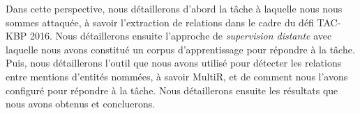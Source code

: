 \documentclass[PhD-Yoann-Dupont.tex]{subfiles}
\begin{document}
Dans cette perspective, nous détaillerons d'abord la tâche à laquelle nous nous sommes attaquée, à savoir l'extraction de relations dans le cadre du défi TAC-KBP 2016. Nous détaillerons ensuite l'approche de \emph{supervision distante} avec laquelle nous avons constitué un corpus d'apprentissage pour répondre à la tâche. Puis, nous détaillerons l'outil que nous avons utilisé pour détecter les relations entre mentions d'entités nommées, à savoir MultiR, et de comment nous l'avons configuré pour répondre à la tâche. Nous détaillerons ensuite les résultats que nous avons obtenus et concluerons.
\end{document}
